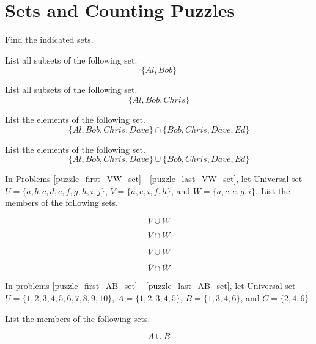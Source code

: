 \section{Sets and Counting Puzzles}

Find the indicated sets.
\begin{puzzle}
    List all subsets of the following set.
    \[\{Al, Bob\}\]
\end{puzzle}

\begin{puzzle}
    List all subsets of the following set.
    \[\{Al, Bob, Chris\}\]
\end{puzzle}

\begin{puzzle}
    List the elements of the following set.
    \[\{Al, Bob, Chris, Dave\} \cap \{Bob, Chris, Dave, Ed\}\]
\end{puzzle}

\begin{puzzle}
    List the elements of the following set.
    \[\{Al, Bob, Chris, Dave\} \cup \{Bob, Chris, Dave, Ed\}\]
\end{puzzle}

In Problems \ref{puzzle_first_VW_set} - \ref{puzzle_last_VW_set}, let Universal set \( U = \{a, b, c, d, e, f, g, h, i, j\} \), \( V = \{a, e, i, f, h\} \), and \( W = \{a, c, e, g, i\} \). List the members of the following sets.

\begin{puzzle}\label{puzzle_first_VW_set}

    \[V \cup W\]
\end{puzzle}

\begin{puzzle}
    \[V \cap W\]
\end{puzzle}

\begin{puzzle}
    \[\overline{V \cup W}\]
\end{puzzle}

\begin{puzzle}\label{puzzle_last_VW_set}
    \[\overline{V} \cap \overline{W}\]
\end{puzzle}

In problems \ref{puzzle_first_AB_set} - \ref{puzzle_last_AB_set}, let Universal set \( U = \{1,2,3,4,5,6,7,8,9,10\} \), \( A = \{1,2,3,4,5\} \), \( B = \{1,3,4,6\} \), and \( C = \{2,4,6\} \).

List the members of the following sets.


\begin{puzzle}\label{puzzle_first_AB_set}
    \[A \cup B\]
\end{puzzle}

